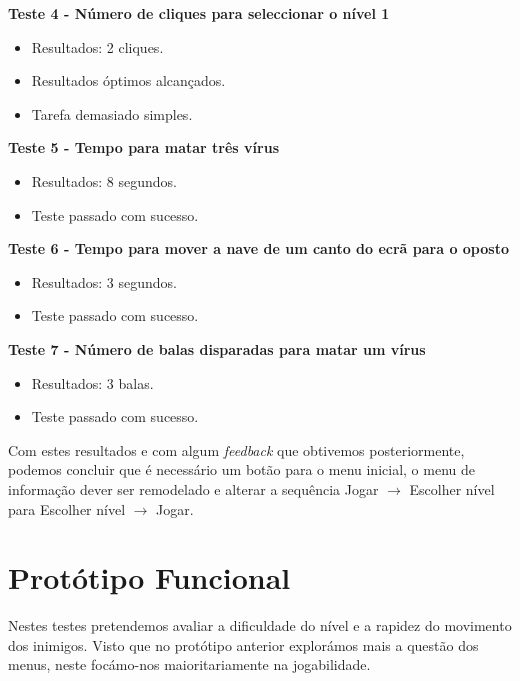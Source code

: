 \textbf{Teste 4 - Número de cliques para seleccionar o nível 1}

\begin{itemize}

\item Resultados: 2 cliques.

\item Resultados óptimos alcançados.

\item Tarefa demasiado simples.
\end{itemize}

\textbf{Teste 5 - Tempo para matar três vírus}

\begin{itemize}

\item Resultados: 8 segundos.

\item Teste passado com sucesso.
\end{itemize}

\textbf{Teste 6 - Tempo para mover a nave de um canto do ecrã para o oposto}

\begin{itemize}

\item Resultados: 3 segundos.

\item Teste passado com sucesso.
\end{itemize}

\textbf{Teste 7 - Número de balas disparadas para matar um vírus}

\begin{itemize}

\item Resultados: 3 balas.

\item Teste passado com sucesso.
\end{itemize}

Com estes resultados e com algum \textit{feedback} que obtivemos posteriormente, podemos concluir que é necessário um botão para o menu inicial, o menu de informação dever ser remodelado e alterar a sequência Jogar $\rightarrow$ Escolher nível para Escolher nível $\rightarrow$ Jogar.

\section{Protótipo Funcional}

Nestes testes pretendemos avaliar a dificuldade do nível e a rapidez do movimento dos inimigos. Visto que no protótipo anterior explorámos mais a questão dos menus, neste focámo-nos maioritariamente na jogabilidade.\\

